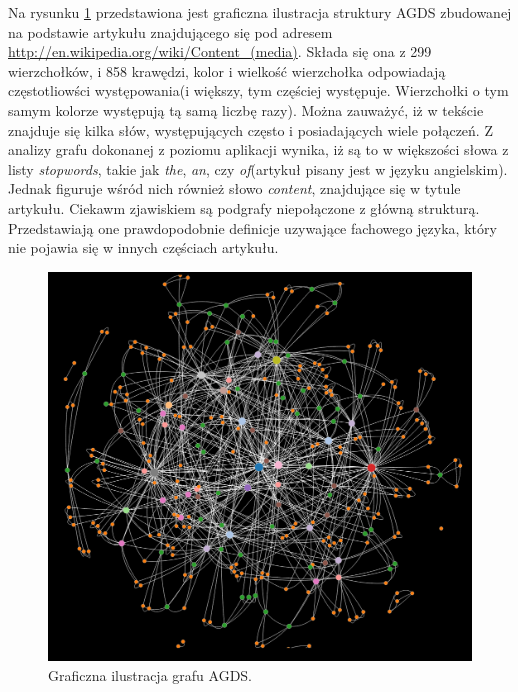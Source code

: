 Na rysunku \ref{graph:grafAgds} przedstawiona jest graficzna ilustracja   struktury AGDS zbudowanej na podstawie artykułu znajdującego się pod adresem \url{http://en.wikipedia.org/wiki/Content_(media)}.
Składa się ona z 299 wierzchołków, i 858 krawędzi, kolor i wielkość wierzchołka odpowiadają częstotliowści występowania(i większy, tym częściej występuje. Wierzchołki o tym samym
kolorze występują tą samą liczbę razy). Można zauważyć, iż w tekście znajduje się kilka słów, występujących często i posiadających wiele połączeń. Z analizy grafu dokonanej z poziomu
aplikacji wynika, iż są to w większości słowa z listy \emph{stopwords}, takie jak \emph{the}, \emph{an}, czy \emph{of}(artykuł pisany jest w języku angielskim). Jednak figuruje wśród nich 
również słowo \emph{content}, znajdujące się w tytule artykułu.
Ciekawm zjawiskiem są podgrafy niepołączone z główną strukturą. Przedstawiają one prawdopodobnie definicje uzywające fachowego języka, który nie pojawia się w innych częściach artykułu.

\begin{figure}[!h]
    \centering
    \label{graph:grafAgds}
    \includegraphics[width=\textwidth]{anakg}
    \caption{Graficzna ilustracja grafu AGDS.}
\end{figure}

